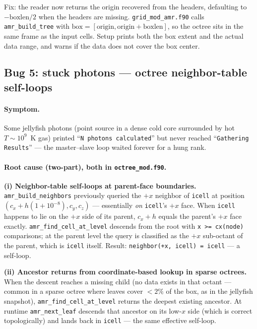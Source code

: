 \documentclass[english,a4paper]{my_memo}
\begin{document}
Fix: the reader now returns the origin recovered from the headers,
defaulting to $-\text{boxlen}/2$ when the headers are missing.
\texttt{grid\_mod\_amr.f90} calls \texttt{amr\_build\_tree} with
$\text{box} = [\text{origin}, \text{origin}+\text{boxlen}]$, so the
octree sits in the same frame as the input cells.  Setup prints both
the box extent and the actual data range, and warns if the data does
not cover the box center.

\subsection{Bug 5: stuck photons --- octree neighbor-table self-loops}

\paragraph{Symptom.}  Some jellyfish photons (point source in a dense
cold core surrounded by hot $T\sim10^9$~K gas) printed
``\texttt{N photons calculated}'' but never reached
``\texttt{Gathering Results}'' --- the master--slave loop waited
forever for a hung rank.

\paragraph{Root cause (two-part), both in \texttt{octree\_mod.f90}.}

\textbf{(i) Neighbor-table self-loops at parent-face boundaries.}
\texttt{amr\_build\_neighbors} previously queried the $+x$ neighbor of
\texttt{icell} at position $(c_x + h(1+10^{-8}), c_y, c_z)$ --- essentially
\emph{on} \texttt{icell}'s $+x$ face.  When \texttt{icell} happens to lie
on the $+x$ side of its parent, $c_x + h$ equals the parent's $+x$ face
exactly.  \texttt{amr\_find\_cell\_at\_level} descends from the root with
\texttt{x >= cx(node)} comparisons; at the parent level the query is
classified as the $+x$ sub-octant of the parent, which is \texttt{icell}
itself.  Result: \texttt{neighbor(+x, icell) = icell} --- a self-loop.

\textbf{(ii) Ancestor returns from coordinate-based lookup in sparse
octrees.}  When the descent reaches a missing child (no data exists in
that octant --- common in a sparse octree where leaves cover $<2\%$ of
the box, as in the jellyfish snapshot),
\texttt{amr\_find\_cell\_at\_level} returns the deepest existing
ancestor.  At runtime \texttt{amr\_next\_leaf} descends that ancestor
on its low-$x$ side (which is correct topologically) and lands back in
\texttt{icell} --- the same effective self-loop.
\end{document}
